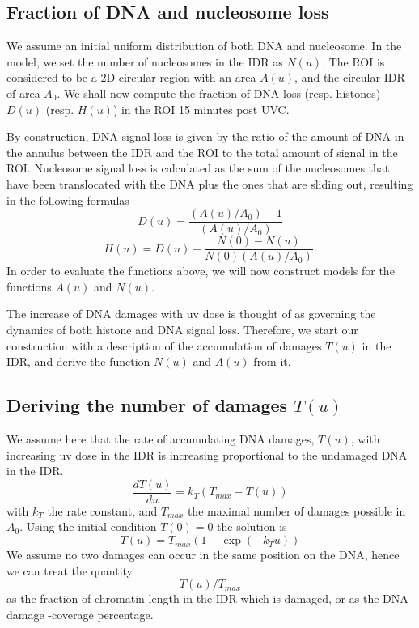 \documentclass[12pt]{article}
\begin{document}
\subsection{Fraction of DNA and nucleosome loss }\label{subsection:fractionOfDNAandNucleosomeLoss}
We assume an initial uniform distribution of both DNA and nucleosome. 
In the model, we set the number of nucleosomes in the IDR as $N(u)$. The ROI is considered to be a 2D circular region with an area $A(u)$, and the circular IDR of area $A_0$. 
We shall now compute the fraction of DNA loss (resp. histones) $D(u)$ (resp. $H(u)$) in the ROI 15 minutes post UVC. 

By construction, DNA signal loss is given by the ratio of the amount of DNA in the annulus between the IDR and the ROI to the total amount of signal in the ROI. Nucleosome signal loss is calculated as the sum of the nucleosomes that have been translocated with the DNA plus the ones that are sliding out, resulting in the following formulas
\begin{equation}\label{eq:DNAStSt}
D(u)= \frac{(A(u)/A_0) -1}{(A(u)/A_0)}
\end{equation}
\begin{equation}
\label{eq:histoneStSt}
H(u)=D(u)+\frac{N(0)-N(u)}{N(0)(A(u)/A_0)}.
\end{equation}
In order to evaluate the functions above, we will now construct models for the functions $A(u)$ and $N(u)$.

The increase of DNA damages with uv dose is thought of as governing the dynamics of both histone and DNA signal loss. Therefore, we start our construction with a description of the accumulation of damages $T(u)$ in the IDR, and derive the function $N(u)$ and $A(u)$ from it.

\subsection{Deriving the number of damages $T(u)$}
We assume here that the rate of accumulating DNA damages, $T(u)$, with increasing uv dose in the IDR is increasing proportional to the undamaged DNA in the IDR.
\begin{equation}
\frac{dT(u)}{du}=k_T\left(T_{max}-T(u)\right)
\end{equation}
with $k_T$ the rate constant, and $T_{max}$ the maximal number of damages possible in $A_0$. 
Using the initial condition $T(0) = 0$ the solution is
\begin{equation}
T(u) = T_{max}\left(1-\exp(-k_T u)\right) 
\end{equation}
We assume no two damages can occur in the same position on the DNA, hence we can treat the quantity 
\begin{equation*}
T(u)/T_{max}
\end{equation*}
as the fraction of chromatin length in the IDR which is damaged, or as the DNA damage -coverage percentage. 
\end{document}
